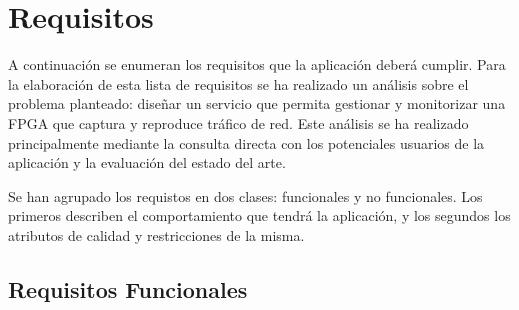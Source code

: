 \chapter{Requisitos\label{cap:requisitos}}

A continuación se enumeran los requisitos que la aplicación deberá cumplir. Para la elaboración de esta lista de requisitos se ha realizado un análisis sobre el problema planteado: diseñar un servicio que permita gestionar y monitorizar una \gls{FPGA} que captura y reproduce tráfico de red. Este análisis se ha realizado principalmente mediante la consulta directa con los potenciales usuarios de la aplicación y la evaluación del estado del arte.

Se han agrupado los requistos en dos clases: funcionales y no funcionales. Los primeros describen el comportamiento que tendrá la aplicación, y los segundos los atributos de calidad y restricciones de la misma.


\section{Requisitos Funcionales\label{sec:req:rf}}

